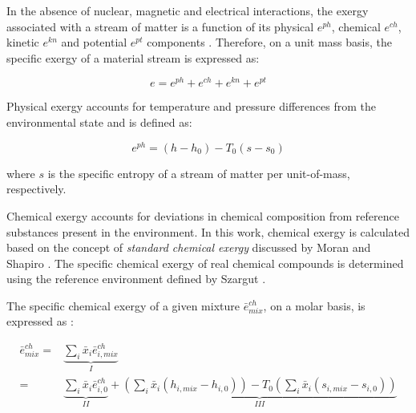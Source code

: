 \documentclass[final,times,5p]{elsarticle}
\begin{document}
	In the absence of nuclear, magnetic and electrical interactions, the exergy associated with a stream of matter is a function of its physical $e^{ph}$, chemical $e^{ch}$, kinetic $e^{kn}$ and potential $e^{pt}$ components \cite{BejanAdrian;TsatsaronisGeorge;Moran1996}. Therefore, on a unit mass basis, the specific exergy of a material stream is expressed as:

		
	\begin{equation}
		e=e^{ph}+e^{ch}+e^{kn}+e^{pt}
	\end{equation}

	Physical exergy accounts for temperature and pressure differences from the environmental state and is defined as:  
		
	\begin{equation}
		e^{ph}=(h-h_0)-T_0(s-s_0) 
	\end{equation}
	
	where $s$ is the specific entropy of a stream of matter per unit-of-mass, respectively. 

	Chemical exergy accounts for deviations in chemical composition from reference substances present in the environment. In this work, chemical exergy is calculated based on the concept of \emph{standard chemical exergy} discussed by Moran and Shapiro \cite{Moran2007}. The specific chemical exergy of real chemical compounds is determined using the reference environment defined by Szargut \cite{Szargut1988,Szargut1989,Morris1986}.

	
	The specific chemical exergy of a given mixture $\bar{e}^{ch}_{mix}$, on a molar basis, is expressed as \cite{Sato2004}:

	\begin{align}
		\bar{e}^{ch}_{mix}=&\underbrace{\sum_i \bar{x}_i \bar{e}^{ch}_{i,mix}}_{I} \nonumber\\
		=&\underbrace{\sum_i \bar{x}_i \bar{e}^{ch}_{i,0}}_{II}+\underbrace{\left(\sum_i \bar{x}_i \left(h_{i,mix}-h_{i,0}\right)\right)-T_0\left(\sum_i \bar{x}_i \left(s_{i,mix}-s_{i,0}\right)\right)}_{III}
	\end{align}
\end{document}
